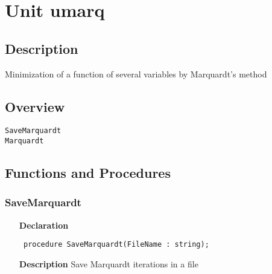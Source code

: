 \documentclass[12pt,a4paper,oneside]{report}
\newcommand{\declarationitem}[1]{\textbf{#1}}
\newcommand{\descriptiontitle}[1]{\textbf{#1}}
\newcommand{\code}[1]{\texttt{#1}}
\begin{document}
\section{Unit umarq}
\label{umarq}
\subsection{Description}
Minimization of a function of several variables by Marquardt's method 
\subsection{Overview}
\begin{description}
	\item[\texttt{SaveMarquardt}]
	\item[\texttt{Marquardt}]
\end{description}
\subsection{Functions and Procedures}
\subsubsection{SaveMarquardt}
\label{umarq-SaveMarquardt}
\begin{itemize}\item[\declarationitem{Declaration}\hfill]
	\begin{flushleft}
		\code{
			procedure SaveMarquardt(FileName : string);}
		
	\end{flushleft}
	
	\par
	\item[\descriptiontitle{Description}]
	Save Marquardt iterations in a file
	
\end{itemize}
\end{document}
